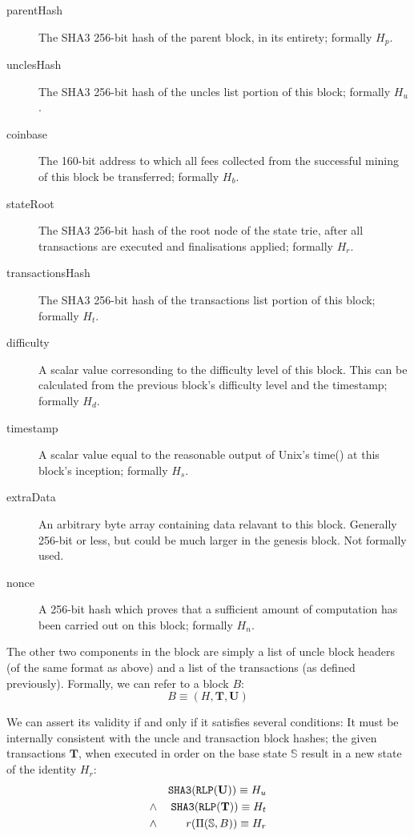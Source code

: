 \documentclass[9pt,oneside]{amsart}
\begin{document}
\begin{multicols}{2}
\begin{description}
\item[parentHash] The SHA3 256-bit hash of the parent block, in its entirety; formally $H_p$.
\item[unclesHash] The SHA3 256-bit hash of the uncles list portion of this block; formally $H_u$.
\item[coinbase] The 160-bit address to which all fees collected from the successful mining of this block be transferred; formally $H_b$.
\item[stateRoot] The SHA3 256-bit hash of the root node of the state trie, after all transactions are executed and finalisations applied; formally $H_r$.
\item[transactionsHash] The SHA3 256-bit hash of the transactions list portion of this block; formally $H_t$.
\item[difficulty] A scalar value corresonding to the difficulty level of this block. This can be calculated from the previous block's difficulty level and the timestamp; formally $H_d$.
\item[timestamp] A scalar value equal to the reasonable output of Unix's time() at this block's inception; formally $H_s$.
\item[extraData] An arbitrary byte array containing data relavant to this block. Generally 256-bit or less, but could be much larger in the genesis block. Not formally used.
\item[nonce] A 256-bit hash which proves that a sufficient amount of computation has been carried out on this block; formally $H_n$.
\end{description}

The other two components in the block are simply a list of uncle block headers (of the same format as above) and a list of the transactions (as defined previously). Formally, we can refer to a block $B$:
\begin{equation}
B \equiv (H, \mathbf{T}, \mathbf{U})
\end{equation}

We can assert its validity if and only if it satisfies several conditions: It must be internally consistent with the uncle and transaction block hashes; the given transactions $\mathbf{T}$, when executed in order on the base state $\mathbb{S}$ result in a new state of the identity $H_r$:
\begin{eqnarray}
& & \mathtt{\tiny SHA3}(\mathtt{\tiny RLP}(\mathbf{U})) \equiv H_u \\
& \wedge & \mathtt{\tiny SHA3}(\mathtt{\tiny RLP}(\mathbf{T})) \equiv H_t \\
& \wedge & r(\Pi(\mathbb{S}, B)) \equiv H_r
\end{eqnarray}


\end{multicols}
\end{document}
